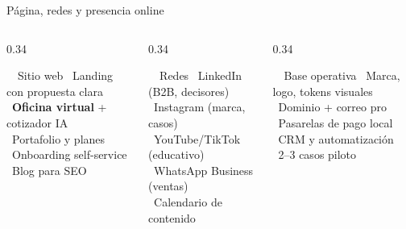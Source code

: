 \documentclass[aspectratio=169,10pt]{beamer}
\newcommand{\chk}{{\color{wmint}\faCheckCircle}~}
\begin{document}
\begin{frame}{Página, redes y presencia online}
  \vspace{0.2em}
  \begin{columns}[T]
    \begin{column}{0.34\textwidth}
      \begin{hcard}[wink]{\faGlobe~~Sitio web}
        \small
        \chk Landing con propuesta clara\\[3pt]
        \chk \textbf{Oficina virtual} + cotizador IA\\[3pt]
        \chk Portafolio y planes\\[3pt]
        \chk Onboarding self-service\\[3pt]
        \chk Blog para SEO
      \end{hcard}
    \end{column}
    \begin{column}{0.34\textwidth}
      \begin{hcard}[wcyan]{\faHashtag~~Redes}
        \small
        \chk LinkedIn (B2B, decisores)\\[3pt]
        \chk Instagram (marca, casos)\\[3pt]
        \chk YouTube/TikTok (educativo)\\[3pt]
        \chk WhatsApp Business (ventas)\\[3pt]
        \chk Calendario de contenido
      \end{hcard}
    \end{column}
    \begin{column}{0.34\textwidth}
      \begin{hcard}[wmint]{\faToolbox~~Base operativa}
        \small
        \chk Marca, logo, tokens visuales\\[3pt]
        \chk Dominio + correo pro\\[3pt]
        \chk Pasarelas de pago local\\[3pt]
        \chk CRM y automatización\\[3pt]
        \chk 2–3 casos piloto
      \end{hcard}
    \end{column}
  \end{columns}
\end{frame}
\end{document}
